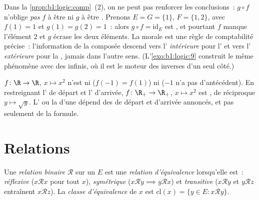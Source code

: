 \begin{example}\label{ex:b1:logic:compsharp}
Dans la \cref{prop:b1:logic:comp}~(2), on ne peut pas renforcer les
conclusions~: $g \circ f$  n'oblige \emph{pas} $f$ à être
 ni $g$ à être . Prenons $E = G = \{1\}$,
$F = \{1, 2\}$, avec $f(1) = 1$ et $g(1) = g(2) = 1$~: alors
$g \circ f = \mathrm{id}_E$ est , et pourtant $f$ manque
l'élément $2$ et $g$ écrase les deux éléments. La morale est une règle
de comptabilité précise~: l'information de la composée descend vers
l' \emph{intérieure} pour l' et vers
l' \emph{extérieure} pour la , jamais dans
l'autre sens. (L'\cref{exo:b1:logic:9} construit le même phénomène avec
des  infinis, où il est le moteur des inverses d'un seul
côté.)
\end{example}

\begin{example}\label{ex:b1:logic:injexamples}
$f \colon \R \to \R$, $x \mapsto x^2$ n'est ni  ($f(-1) =
f(1)$) ni  ($-1$ n'a pas d'antécédent). En restreignant
l' de départ et l' d'arrivée, $f \colon \R_+ \to \R_+$,
$x \mapsto x^2$ est , de réciproque $y \mapsto \sqrt y$.
L' ou la  d'une  dépend des 
de départ et d'arrivée annoncés, et pas seulement de la formule.
\end{example}

\section{Relations}

\begin{definition}\label{def:b1:logic:equiv}
Une \emph{relation binaire} $\mathcal{R}$ sur un  $E$ est une
\emph{relation d'équivalence} lorsqu'elle
est~: \emph{réflexive} ($x \mathbin{\mathcal{R}} x$ pour tout $x$),
\emph{symétrique} ($x \mathbin{\mathcal{R}} y \implies y
\mathbin{\mathcal{R}} x$) et \emph{transitive} ($x
\mathbin{\mathcal{R}} y$ et $y \mathbin{\mathcal{R}} z$ entraînent $x
\mathbin{\mathcal{R}} z$). La \emph{classe d'équivalence} de $x$ est
$\mathrm{cl}(x) = \{y \in E : x \mathbin{\mathcal{R}} y\}$.
\end{definition}

